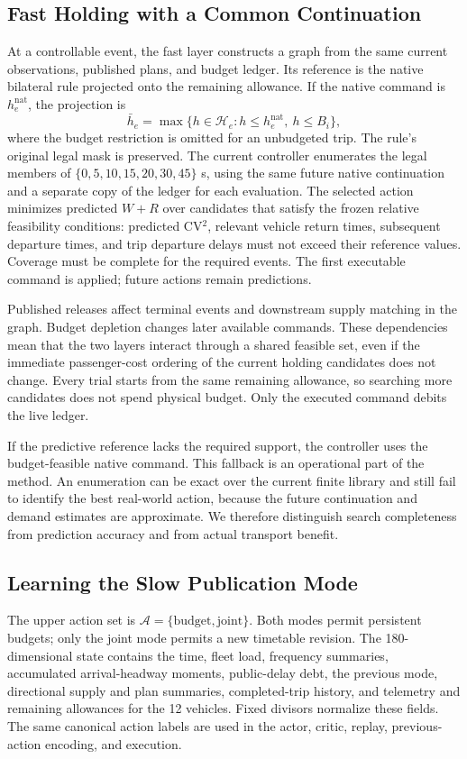 \subsection{Fast Holding with a Common Continuation}
At a controllable event, the fast layer constructs a graph from the same current observations, published plans, and budget ledger. Its reference is the native bilateral rule projected onto the remaining allowance. If the native command is $h_e^{\mathrm{nat}}$, the projection is
\begin{equation}
 \bar h_e=\max\{h\in\mathcal H_e:h\leq h_e^{\mathrm{nat}},\ h\leq B_i\},
 \label{eq:projection}
\end{equation}
where the budget restriction is omitted for an unbudgeted trip. The rule's original legal mask is preserved. The current controller enumerates the legal members of $\{0,5,10,15,20,30,45\}$ s, using the same future native continuation and a separate copy of the ledger for each evaluation. The selected action minimizes predicted $W+R$ over candidates that satisfy the frozen relative feasibility conditions: predicted CV$^2$, relevant vehicle return times, subsequent departure times, and trip departure delays must not exceed their reference values. Coverage must be complete for the required events. The first executable command is applied; future actions remain predictions.

Published releases affect terminal events and downstream supply matching in the graph. Budget depletion changes later available commands. These dependencies mean that the two layers interact through a shared feasible set, even if the immediate passenger-cost ordering of the current holding candidates does not change. Every trial starts from the same remaining allowance, so searching more candidates does not spend physical budget. Only the executed command debits the live ledger.

If the predictive reference lacks the required support, the controller uses the budget-feasible native command. This fallback is an operational part of the method. An enumeration can be exact over the current finite library and still fail to identify the best real-world action, because the future continuation and demand estimates are approximate. We therefore distinguish search completeness from prediction accuracy and from actual transport benefit.

\subsection{Learning the Slow Publication Mode}
The upper action set is $\mathcal A=\{\mathrm{budget},\mathrm{joint}\}$. Both modes permit persistent budgets; only the joint mode permits a new timetable revision. The 180-dimensional state contains the time, fleet load, frequency summaries, accumulated arrival-headway moments, public-delay debt, the previous mode, directional supply and plan summaries, completed-trip history, and telemetry and remaining allowances for the 12 vehicles. Fixed divisors normalize these fields. The same canonical action labels are used in the actor, critic, replay, previous-action encoding, and execution.

